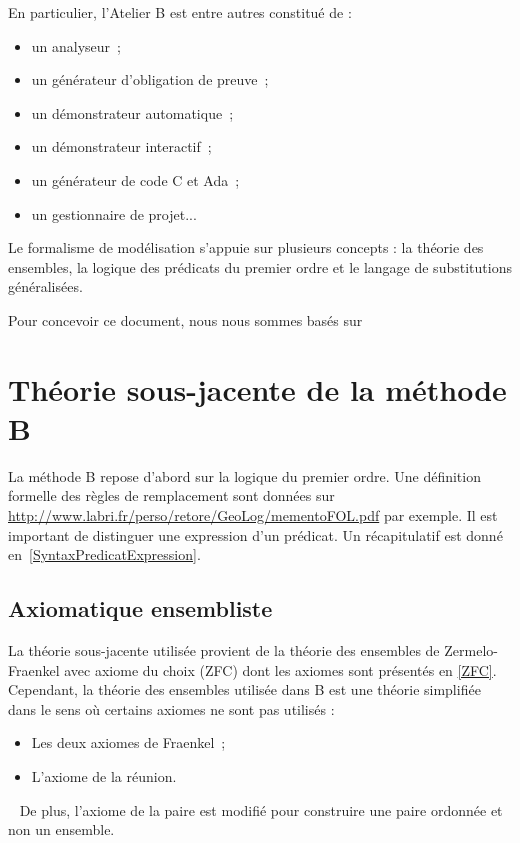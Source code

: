 \documentclass[10pt,a4paper]{article}
\begin{document}
En particulier, l'Atelier B est entre autres constitué de :
\begin{itemize}
\item un analyseur~;
\item un générateur d'obligation de preuve~;
\item un démonstrateur automatique~;
\item un démonstrateur interactif~;
\item un générateur de code C et Ada~;
\item un gestionnaire de projet...
\end{itemize}

Le formalisme de modélisation s'appuie sur plusieurs concepts : la théorie des ensembles, la logique des prédicats du premier ordre et le langage de substitutions généralisées.

Pour concevoir ce document, nous nous sommes basés sur \cite{behm1999meteor, habrias2006specifications, theBBook, dossierTechnique, VerimagPDF}

\section{Théorie sous-jacente de la méthode B}

La méthode B repose d'abord sur la logique du premier ordre. Une définition formelle des règles de remplacement sont données sur \url{http://www.labri.fr/perso/retore/GeoLog/mementoFOL.pdf} par exemple. Il est important de distinguer une expression d'un prédicat. Un récapitulatif est donné en~\cref{SyntaxPredicatExpression}.

\subsection{Axiomatique ensembliste}

La théorie sous-jacente utilisée provient de la théorie des ensembles de Zermelo-Fraenkel avec axiome du choix (ZFC) dont les axiomes sont présentés en \cref{ZFC}.
Cependant, la théorie des ensembles utilisée dans B est une théorie simplifiée dans le sens où certains axiomes ne sont pas utilisés :
\begin{itemize}
\item Les deux axiomes de  Fraenkel~;
\item L'axiome de la réunion.
\end{itemize}~
De plus, l'axiome de la paire est modifié pour construire une paire ordonnée et non un ensemble. 
\end{document}
